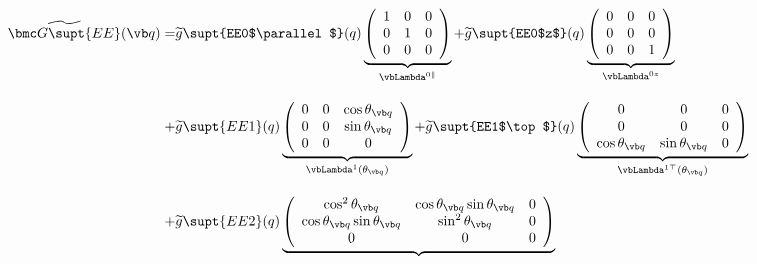 \documentclass[letterpaper]{article}
\renewcommand{\wt}{\widetilde}
\begin{document}
\begin{align*}
 \wt{\bmc G\supt{EE}}(\vb q)
 = &\wt{g}\supt{EE0$\parallel$}(q)
    \underbrace{ \left(\begin{array}{ccc}
                       1 & 0 & 0 \\ 
                       0 & 1 & 0 \\ 
                       0 & 0 & 0 \\ 
                 \end{array}\right)
               }_{\vbLambda^{0\parallel}}
  + \wt{g}\supt{EE0$z$}(q)
    \underbrace{ \left(\begin{array}{ccc}
                       0 & 0 & 0 \\ 
                       0 & 0 & 0 \\ 
                       0 & 0 & 1 \\ 
                 \end{array}\right)
               }_{\vbLambda^{0z}}
\\[10pt]
 + &\wt{g}\supt{EE1}(q)
    \underbrace{ \left(\begin{array}{ccc}
                       0 & 0 & \cos\theta_{\vb q} \\ 
                       0 & 0 & \sin\theta_{\vb q} \\ 
                       0 & 0 & 0
                 \end{array}\right)
               }_{\vbLambda^{1}(\theta_{\vb q})}
 +  \wt{g}\supt{EE1$\top$}(q)
    \underbrace{ \left(\begin{array}{ccc}
                       0 & 0 & 0 \\
                       0 & 0 & 0 \\
                       \cos\theta_{\vb q} & \sin\theta_{\vb q} & 0
                 \end{array}\right)
               }_{\vbLambda^{1\top}(\theta_{\vb q})}
\\[10pt]
  +&\wt{g}\supt{EE2}(q)
    \underbrace{
   \left(\begin{array}{ccc}
    \cos^2\theta_{\vb q}  & \cos\theta_{\vb q} \sin\theta_{\vb q} & 0 \\
    \cos\theta_{\vb q} \sin\theta_{\vb q} & \sin^2\theta_{\vb q}  & 0 \\
    0                     & 0                    & 0 
   \end{array}\right)
}
\end{align*}
\end{document}
